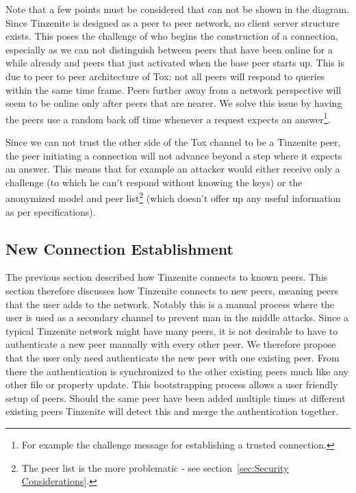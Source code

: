 Note that a few points must be considered that can not be shown in the diagram.
Since Tinzenite is designed as a peer to peer network, no client server structure exists.
This poses the challenge of who begins the construction of a connection, especially as we can not distinguish between peers that have been online for a while already and peers that just activated when the base peer starts up.
This is due to peer to peer architecture of Tox: not all peers will respond to queries within the same time frame.
Peers further away from a network perspective will seem to be online only after peers that are nearer.
We solve this issue by having the peers use a random back off time whenever a request expects an answer\footnote{For example the challenge message for establishing a trusted connection.}.

Since we can not trust the other side of the Tox channel to be a Tinzenite peer, the peer initiating a connection will not advance beyond a step where it expects an answer.
This means that for example an attacker would either receive only a challenge (to which he can't respond without knowing the keys) or the anonymized model and peer list\footnote{The peer list is the more problematic - see section~\ref{sec:Security Considerations}.} (which doesn't offer up any useful information as per specifications).

\subsection{New Connection Establishment}

The previous section described how Tinzenite connects to known peers.
This section therefore discusses how Tinzenite connects to new peers, meaning peers that the user adds to the network.
Notably this is a manual process where the user is used as a secondary channel to prevent man in the middle attacks.
Since a typical Tinzenite network might have many peers, it is not desirable to have to authenticate a new peer manually with every other peer.
We therefore propose that the user only need authenticate the new peer with one existing peer.
From there the authentication is synchronized to the other existing peers much like any other file or property update.
This bootstrapping process allows a user friendly setup of peers.
Should the same peer have been added multiple times at different existing peers Tinzenite will detect this and merge the authentication together.


